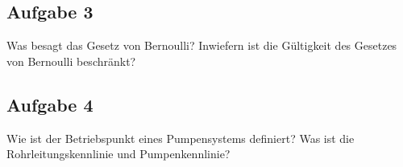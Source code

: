 \documentclass[a4paper,11pt]{article}
\newif\ifshowme
\begin{document}
\subsection*{Aufgabe 3}
Was besagt das Gesetz von Bernoulli? Inwiefern
ist die Gültigkeit des Gesetzes von Bernoulli 
beschränkt?

\subsection*{Aufgabe 4}
Wie ist der Betriebspunkt eines Pumpensystems definiert? Was ist die Rohrleitungskennlinie und Pumpenkennlinie?




\pagebreak
\ifshowme
\antwort{
\textbf{Aufgabe 1}
\begin{align*}
\Delta p_{\mathsmaller{R}} &= \left( \xi_{Rohr} \cdot \frac{l}{d} + \sum \zeta_{Bauteil} \right) \cdot \frac{1}{2}\rho \overline{v}^2 \\
&= \left( 0,02 \cdot \frac{5 ~\text{m}}{0,046~\text{m}} + 2 \cdot 0,7 \right) \cdot \frac{1}{2} \cdot 950~\text{kg/m}^3 \cdot \left(\frac{0,05 ~\text{m}^3\text{/s}}{\pi \cdot (0,5 \cdot 0,046~\text{m})^2}\right)^2 \\
&= 3,574 \cdot \frac{1}{2} \cdot 950~\text{kg/m}^3 \cdot (30,086 ~\text{m/s})^2 \\
&= 1.536.645~\text{Pa} \\
&= 15,37 ~\text{bar}
\end{align*}

}
\else
\fi
\end{document}
